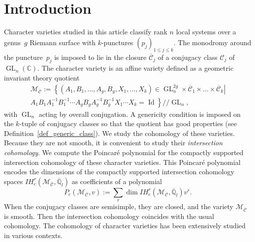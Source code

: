 \documentclass[JEP,XML,SOM,NoEqCountersInSection,Unicode,published]{cedram}
\newcommand{\gitquot}{/\!\!/}
\newcommand{\rc}{\mathrm{c}}
\theoremstyle{definition}
\theoremstyle{plain}
\DeclareMathOperator{\Id}{Id}
\DeclareMathOperator{\GL}{GL}
\newcommand{\C}{\mathbb{C}}
\newcommand{\qlbar}{\overline{\mathbb{Q}}_l}
\newcommand{\IH}{\mathit{IH}}
\newcommand{\inv}{^{-1}}
\newcommand{\mcbar}{\mathcal{M}_{\boldsymbol{\overline{\mathcal{C}}}}}
\begin{document}
\section{Introduction}
Character varieties studied in this article classify rank $n$ local systems over a genus~$g$ Riemann surface with $k$-punctures $(p_j)_{1\le j \le k}$. The monodromy around the puncture~$p_j$ is imposed to lie in the closure $\overline{\mathcal{C}}_j$ of a conjugacy class $\mathcal{C}_j$ of $\GL_n(\C)$. The character variety is an affine variety defined as a geometric invariant theory quotient
\begin{multline*}
\mathcal{M}_{\boldsymbol{\overline{\mathcal{C}}}}:=\left\lbrace\left(A_1,B_1,\dots,A_g,B_g,X_1,\dots,X_k\right)\in \GL_n^{2g}\times \overline{\mathcal{C}}_{1}\times\dots\times \overline{\mathcal{C}}_{k}\right| \\ \left. A_1 B_1 A_1\inv B_1\inv \cdots A_g B_g A_g\inv B_g\inv X_1\cdots X_k =\Id\right\rbrace \gitquot \GL_n,
\end{multline*}
with $\GL_n$ acting by overall conjugation. A genericity condition is imposed on the $k$\nobreakdash-tuple of conjugacy classes so that the quotient has good properties (see Definition~\ref{def_generic_class}). We study the cohomology of these varieties. Because they are not smooth, it is convenient to study their \textit{intersection cohomology}. We compute the Poincaré polynomial for the compactly supported intersection cohomology of these character varieties. This Poincaré polynomial encodes the dimensions of the compactly supported intersection cohomology spaces $\IH_{\rc}^r\left(\mathcal{M}_{\boldsymbol{\overline{\mathcal{C}}}}, \qlbar\right)$ as coefficients of a polynomial\vspace*{-2pt}\enlargethispage{.5\baselineskip}
\[
P_{\rc} \left(\mcbar, v\right):=\sum_r \dim \IH_{\rc}^r\left(\mathcal{M}_{\boldsymbol{\overline{\mathcal{C}}}}, \qlbar\right) v^r.
\]
When the conjugacy classes are semisimple, they are closed, and the variety $\mcbar$ is smooth. Then the intersection cohomology coincides with the usual cohomology. The cohomology of character varieties has been extensively studied in various contexts.

\end{document}
